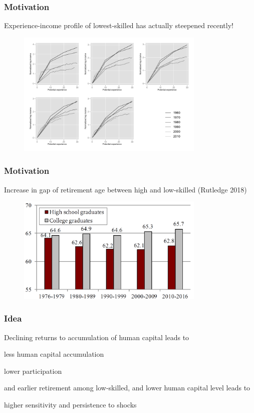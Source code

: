 \documentclass[aspectratio=169]{beamer}
\newenvironment{wideitemize}{\itemize\addtolength{\itemsep}{10pt}}{\enditemize}
\begin{document}
\begin{frame}
    \frametitle{Motivation}

    Experience-income profile of lowest-skilled has actually steepened recently!
    \begin{figure}[t]
        \includegraphics[width=0.8\textwidth]{../output/exp_wage_profile_cohort.pdf}
        \centering
    \end{figure}
\end{frame}

\begin{frame}
    \frametitle{Motivation}

    Increase in gap of retirement age between high and low-skilled (Rutledge 2018)
    \begin{figure}[t]
        \includegraphics[width=0.8\textwidth]{../output/retirement.png}
        \centering
    \end{figure}

\end{frame}


\begin{frame}
    \frametitle{Idea}
    Declining returns to accumulation of human capital leads to
    \begin{wideitemize}
        \item less human capital accumulation
        \item lower participation
        \item and earlier retirement
    \end{wideitemize}
    among low-skilled, and lower human capital level leads to
    \begin{wideitemize}
        \item higher sensitivity and persistence to shocks
    \end{wideitemize}

\end{frame}
\end{document}
